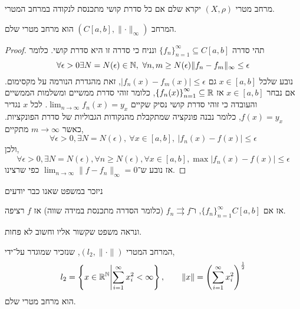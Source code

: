 \begin{definition}
	מרחב מטרי $(X, \rho)$ יקרא שלם אם כל סדרת קושי מתכנסת לנקודה במרחב המטרי.
\end{definition}
\begin{theorem}
	המרחב $(C[a, b], \lVert \cdot \rVert_\infty)$ הוא מרחב מטרי שלם.
\end{theorem}
\begin{proof}
	תהי סדרה ${\{ f_n \}}_{n = 1}^\infty \subseteq C[a, b]$ ונניח כי סדרה זו היא סדרת קושי.
	כלומר
	\[
		\forall \epsilon > 0 \exists N = N(\epsilon) \in \mathbb{N},\ \forall n, m \ge N(\epsilon) \lVert f_n - f_m\rVert_\infty \le \epsilon
	\]
	נובע שלכל $x \in [a, b]$ גם $|f_n(x) - f_m(x)| \le \epsilon$, זאת מהגדרת הנורמה על מקסימום.
	אם נבחר $x \in [a, b]$ אז ${\{ f_n(x) \}}_{n = 1}^\infty \subseteq \mathbb{R}$, כלומר זוהי סדרת ממשיים ומשלמות הממשיים והעובדה כי זוהי סדרת קושי נסיק שקיים $\lim_{n \to \infty} f_n(x) = y_x$.
	לכל $x$ נגדיר $f(x) = y_x$, כלומר נבנה פונקציה שמתקבלת מהנקודות הגבוליות של סדרת הפונקציות.
	כאשר $m \to \infty$ מתקיים,
	\[
		\forall \epsilon > 0, \exists N = N(\epsilon),\ \forall x \in [a, b],\ |f_n(x) - f(x)| \le \epsilon
	\]
	ולכן,
	\[
		\forall \epsilon > 0,
		\exists N = N(\epsilon),
		\forall n \ge N(\epsilon), \forall x \in [a, b], \max |f_n(x) - f(x)| \le \epsilon
	\]
	אז נובע ש־$\lim_{n \to \infty} \lVert f - f_n \rVert_\infty = 0$ כפי שרצינו.
\end{proof}
ניזכר במשפט שאנו כבר יודעים
\begin{theorem}
	אז אם ${\{ f_n \}}_{n = 1}^\infty C[a, b]$, ו־$f_n \rightrightarrows f$ (כלומר הסדרה מתכנסת במידה שווה) אז $f$ רציפה.
\end{theorem}
ונראה משפט שקשור אליו וחשוב לא פחות.
\begin{theorem}[שלמות l2]
	המרחב המטרי $(l_2, \lVert \cdot \rVert)$, שנזכיר שמוגדר על־ידי,
	\[
		l_2 = \left\{ x \in \mathbb{R}^{\mathbb{N}} \middle| \sum_{i = 1}^\infty x_i^2 < \infty \right\},
		\qquad \lVert x \rVert = {\left(\sum_{i = 1}^\infty x_i^2\right)}^{\frac{1}{2}}
	\]
	הוא מרחב מטרי שלם.
\end{theorem}

